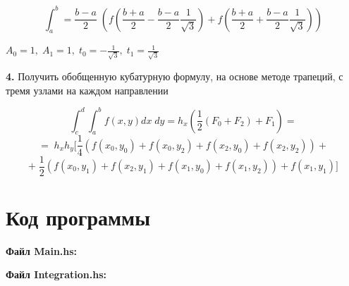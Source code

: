 \documentclass[a4paper,12pt]{article}
\begin{document}
$$ \int_{a}^{b} = \frac{b - a}{2} \; (f(\frac{b + a}{2} - \frac{b - a}{2} \frac{1}{\sqrt{3}}) + f(\frac{b + a}{2} + \frac{b - a}{2} \frac{1}{\sqrt{3}})) $$\newline

\noindent $A_{0} = 1, \; A_{1} = 1, \; t_{0} = -\frac{1}{\sqrt{3}}, \; t_{1} = \frac{1}{\sqrt{3}}$ \newline


\noindent\textbf{4.} Получить обобщенную кубатурную формулу, на основе методе трапеций, с тремя узлами на каждом направлении \newline

$$ \int_{c}^{d}\int_{a}^{b}f(x, y)dx\;dy = h_{x} (\frac{1}{2} (F_{0} + F_{2}) + F_{1} ) = $$
$$ = \; h_{x} h_{y} [\frac{1}{4} (f(x_{0}, y_{0}) + f(x_{0}, y_{2}) + f(x_{2}, y_{0}) + f(x_{2}, y_{2})) + $$
$$ + \; \frac{1}{2}(f(x_{0}, y_{1}) + f(x_{2}, y_{1}) + f(x_{1}, y_{0}) + f(x_{1}, y_{2})) + f(x_{1}, y_{1})]$$

\clearpage
\section{Код программы}
\noindent\textbf{Файл Main.hs:}


\noindent\textbf{\newline Файл Integration.hs:}

\end{document}
